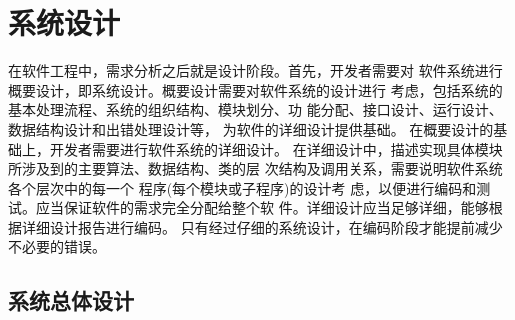
\chapter{系统设计}
在软件工程中，需求分析之后就是设计阶段。首先，开发者需要对
软件系统进行概要设计，即系统设计。概要设计需要对软件系统的设计进行
考虑，包括系统的基本处理流程、系统的组织结构、模块划分、功
能分配、接口设计、运行设计、数据结构设计和出错处理设计等，
为软件的详细设计提供基础。
在概要设计的基础上，开发者需要进行软件系统的详细设计。
在详细设计中，描述实现具体模块所涉及到的主要算法、数据结构、类的层
次结构及调用关系，需要说明软件系统各个层次中的每一个
程序(每个模块或子程序)的设计考
虑，以便进行编码和测试。应当保证软件的需求完全分配给整个软
件。详细设计应当足够详细，能够根据详细设计报告进行编码。
只有经过仔细的系统设计，在编码阶段才能提前减少不必要的错误。
\section{系统总体设计}
